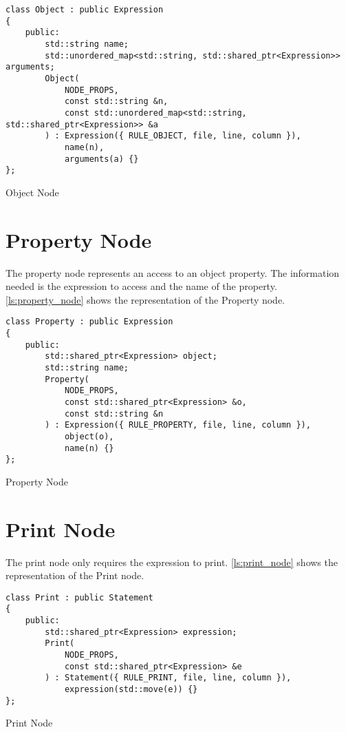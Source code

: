 \begin{listing}[H]
\begin{verbatim}
class Object : public Expression
{
    public:
        std::string name;
        std::unordered_map<std::string, std::shared_ptr<Expression>> arguments;
        Object(
            NODE_PROPS,
            const std::string &n,
            const std::unordered_map<std::string, std::shared_ptr<Expression>> &a
        ) : Expression({ RULE_OBJECT, file, line, column }),
            name(n),
            arguments(a) {}
};
\end{verbatim}
\caption{Object Node}
\label{ls:object_node}
\end{listing}

\section{Property Node}

The property node represents an access to an object property.
The information needed is the expression to access and the name of the property.
\autoref{ls:property_node} shows the representation of the Property node.

\begin{listing}[H]
\begin{verbatim}
class Property : public Expression
{
    public:
        std::shared_ptr<Expression> object;
        std::string name;
        Property(
            NODE_PROPS,
            const std::shared_ptr<Expression> &o,
            const std::string &n
        ) : Expression({ RULE_PROPERTY, file, line, column }),
            object(o),
            name(n) {}
};
\end{verbatim}
\caption{Property Node}
\label{ls:property_node}
\end{listing}

\section{Print Node}

The print node only requires the expression to print.
\autoref{ls:print_node} shows the representation of the Print node.

\begin{listing}[H]
\begin{verbatim}
class Print : public Statement
{
    public:
        std::shared_ptr<Expression> expression;
        Print(
            NODE_PROPS,
            const std::shared_ptr<Expression> &e
        ) : Statement({ RULE_PRINT, file, line, column }),
            expression(std::move(e)) {}
};
\end{verbatim}
\caption{Print Node}
\label{ls:print_node}
\end{listing}

